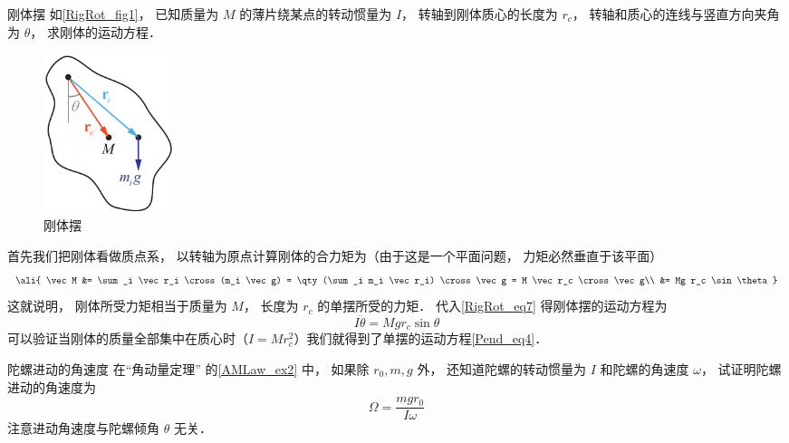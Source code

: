 \begin{exam}{刚体摆}\label{RigRot_ex1}
如\autoref{RigRot_fig1}， 已知质量为 $M$ 的薄片绕某点的转动惯量为 $I$， 转轴到刚体质心的长度为 $r_c$， 转轴和质心的连线与竖直方向夹角为 $\theta$， 求刚体的运动方程．
\begin{figure}[ht]
\centering
\includegraphics[width=3.8cm]{./figures/RigRot1.pdf}
\caption{刚体摆} \label{RigRot_fig1}
\end{figure}

首先我们把刚体看做质点系， 以转轴为原点计算刚体的合力矩为（由于这是一个平面问题， 力矩必然垂直于该平面）
\begin{equation}\ali{
\vec M &= \sum_i \vec r_i \cross (m_i \vec g)
= \qty(\sum_i m_i \vec r_i) \cross \vec g
= M \vec r_c \cross \vec g\\
&= Mg r_c \sin\theta
}\end{equation}
这就说明， 刚体所受力矩相当于质量为 $M$， 长度为 $r_c$ 的单摆所受的力矩． 代入\autoref{RigRot_eq7} 得刚体摆的运动方程为
\begin{equation}
I\ddot \theta = Mg r_c \sin\theta
\end{equation}
可以验证当刚体的质量全部集中在质心时（$I = Mr_c^2$）我们就得到了单摆的运动方程\autoref{Pend_eq4}．
\end{exam}

\begin{exer}{陀螺进动的角速度}
在“角动量定理” 的\autoref{AMLaw_ex2} 中， 如果除 $r_0, m, g$ 外， 还知道陀螺的转动惯量为 $I$ 和陀螺的角速度 $\omega$， 试证明陀螺进动的角速度为
\begin{equation}
\Omega = \frac{mgr_0}{I\omega}
\end{equation}
注意进动角速度与陀螺倾角 $\theta$ 无关．
\end{exer}










